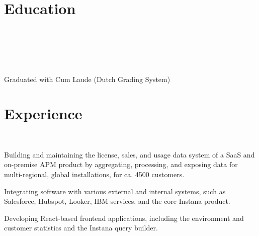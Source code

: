 \documentclass[]{deedy-resume-openfont}
\begin{document}
    
%
%


%
%

\section{Education}
\raggedright

\\ \\
    
\sectionsep

\\ \\
Graduated with Cum Laude (Dutch Grading System)\\

\sectionsep


%
%
\section{Experience}

\\ 
\begin{tightemize}
	\item Building and maintaining the license, sales, and usage data system of a SaaS and on-premise APM product by aggregating, processing, and exposing data for multi-regional, global installations, for ca. 4500 customers.
	\item Integrating software with various external and internal systems, such as Salesforce, Hubspot, Looker, IBM services, and the core Instana product.
	\item Developing React-based frontend applications, including the environment and customer statistics and the Instana query builder.
\end{tightemize}
\end{document}
